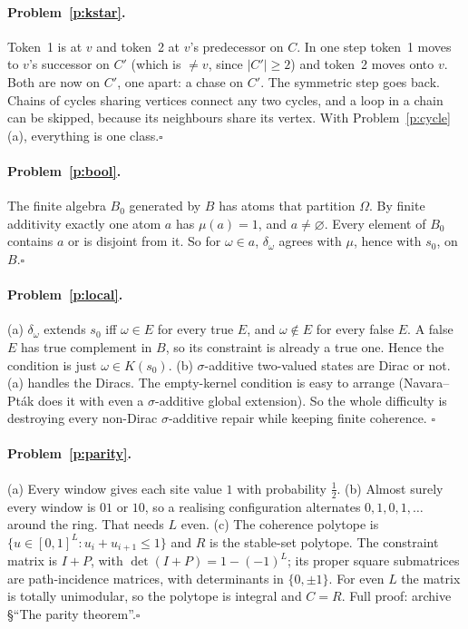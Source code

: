 \documentclass[11pt]{article}
\theoremstyle{definition}
\theoremstyle{remark}
\begin{document}
\paragraph{Problem~\ref{p:kstar}.}
Token~1 is at $v$ and token~2 at $v$'s predecessor on $C$. In one step token~1
moves to $v$'s successor on $C'$ (which is $\ne v$, since $|C'|\ge2$) and token~2
moves onto $v$. Both are now on $C'$, one apart: a chase on $C'$. The symmetric
step goes back. Chains of cycles sharing vertices connect any two cycles, and a
loop in a chain can be skipped, because its neighbours share its vertex. With
Problem~\ref{p:cycle}(a), everything is one class.\hfill$\square$

\paragraph{Problem~\ref{p:bool}.}
The finite algebra $B_0$ generated by $B$ has atoms that partition $\Omega$. By
finite additivity exactly one atom $a$ has $\mu(a)=1$, and $a\ne\varnothing$.
Every element of $B_0$ contains $a$ or is disjoint from it. So for $\omega\in a$,
$\delta_\omega$ agrees with $\mu$, hence with $s_0$, on $B$.\hfill$\square$

\paragraph{Problem~\ref{p:local}.}
(a) $\delta_\omega$ extends $s_0$ iff $\omega\in E$ for every true $E$, and
$\omega\notin E$ for every false $E$. A false $E$ has true complement in $B$, so
its constraint is already a true one. Hence the condition is just
$\omega\in K(s_0)$.
(b) $\sigma$-additive two-valued states are Dirac or not. (a) handles the Diracs.
The empty-kernel condition is easy to arrange (Navara--Pt\'ak does it with even a
$\sigma$-additive global extension). So the whole difficulty is destroying every
non-Dirac $\sigma$-additive repair while keeping finite coherence.
\hfill$\square$

\paragraph{Problem~\ref{p:parity}.}
(a) Every window gives each site value $1$ with probability $\tfrac12$.
(b) Almost surely every window is $01$ or $10$, so a realising configuration
alternates $0,1,0,1,\dots$ around the ring. That needs $L$ even.
(c) The coherence polytope is $\{u\in[0,1]^L: u_i+u_{i+1}\le1\}$ and $R$ is the
stable-set polytope. The constraint matrix is $I+P$, with
$\det(I+P)=1-(-1)^L$; its proper square submatrices are path-incidence matrices,
with determinants in $\{0,\pm1\}$. For even $L$ the matrix is totally unimodular,
so the polytope is integral and $C=R$. Full proof: archive
\S``The parity theorem''.\hfill$\square$
\end{document}
